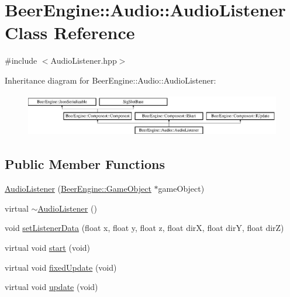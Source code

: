 \hypertarget{class_beer_engine_1_1_audio_1_1_audio_listener}{}\section{Beer\+Engine\+:\+:Audio\+:\+:Audio\+Listener Class Reference}
\label{class_beer_engine_1_1_audio_1_1_audio_listener}


{\ttfamily \#include $<$Audio\+Listener.\+hpp$>$}

Inheritance diagram for Beer\+Engine\+:\+:Audio\+:\+:Audio\+Listener\+:\begin{figure}[H]
\begin{center}
\leavevmode
\includegraphics[height=1.875000cm]{class_beer_engine_1_1_audio_1_1_audio_listener}
\end{center}
\end{figure}
\subsection*{Public Member Functions}
\begin{DoxyCompactItemize}
\item 
\mbox{\hyperlink{class_beer_engine_1_1_audio_1_1_audio_listener_a7f652b4e6cd4df8038630081fa475d62}{Audio\+Listener}} (\mbox{\hyperlink{class_beer_engine_1_1_game_object}{Beer\+Engine\+::\+Game\+Object}} $\ast$game\+Object)
\item 
virtual \mbox{\hyperlink{class_beer_engine_1_1_audio_1_1_audio_listener_a7fb8733754e4c09b5a32792b3beb78b1}{$\sim$\+Audio\+Listener}} ()
\item 
void \mbox{\hyperlink{class_beer_engine_1_1_audio_1_1_audio_listener_a8d22256683171dcdc258a5e3f707701c}{set\+Listener\+Data}} (float x, float y, float z, float dirX, float dirY, float dirZ)
\item 
virtual void \mbox{\hyperlink{class_beer_engine_1_1_audio_1_1_audio_listener_a1d4d5e21f30edb7dba64e87f0712c3b3}{start}} (void)
\item 
virtual void \mbox{\hyperlink{class_beer_engine_1_1_audio_1_1_audio_listener_ad3d6b34a33582c17e2c7bc250e4e6937}{fixed\+Update}} (void)
\item 
virtual void \mbox{\hyperlink{class_beer_engine_1_1_audio_1_1_audio_listener_a32c348d619ff2ca57d16af803d7dfcfd}{update}} (void)
\end{DoxyCompactItemize}
